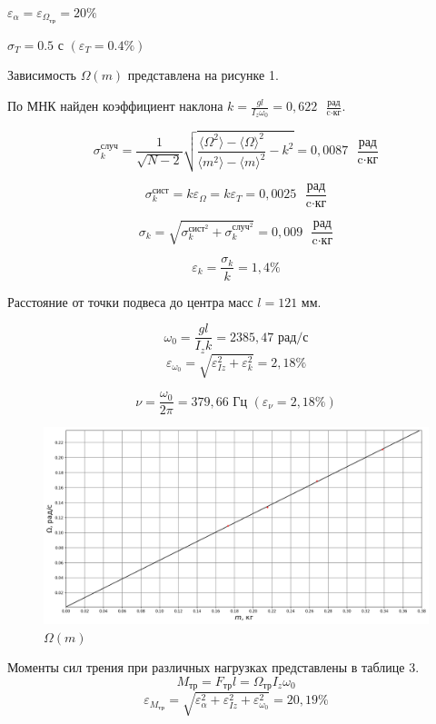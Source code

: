 \documentclass[a4paper, 12pt]{article}
\begin{document}
$\varepsilon_{\alpha} = \varepsilon_{\Omega_{\text{тр}}} = 20\%$

$\sigma_T = 0.5 \text{ с } (\varepsilon_{T} = 0.4\%)$

Зависимость $\Omega(m)$ представлена на рисунке 1.

По МНК найден коэффициент наклона $k = \frac{gl}{I_z\omega_0} = 0,622  \text{ }\frac{\text{рад}}{\text{c}\cdot\text{кг}}$.

\[ \sigma_k^{\text{случ}} = \frac{1}{\sqrt{N - 2}}\sqrt{\frac{\langle {\Omega}^2 \rangle -\langle {\Omega} \rangle^2}{
    \langle m^2 \rangle - \langle m \rangle^2} - k^2} = 0,0087 \text{ }\frac{\text{рад}}{\text{c}\cdot\text{кг}}\]

\[ \sigma_k^{\text{сист}} = k \varepsilon_{\Omega} = k \varepsilon_{T} = 0,0025 \text{ }\frac{\text{рад}}{\text{c}\cdot\text{кг}}\]

\[ \sigma_{k} = \sqrt{\sigma_k^{{\text{сист}}^2}+\sigma_k^{{\text{случ}}^2}} = 0,009 \text{ }\frac{\text{рад}}{\text{c}\cdot\text{кг}}\]

\[ \varepsilon_k = \frac{\sigma_k}{k} = 1,4 \%\]

Расстояние от точки подвеса до центра масс $l = 121$ мм.

\[ \omega_0 = \frac{gl}{I_z k} = 2385,47 \text{ рад/с}\]
\[ \varepsilon_{\omega_0} = \sqrt{\varepsilon_{Iz}^2+\varepsilon_k^2} = 2,18\%\]

\[ \nu = \frac{\omega_0}{2\pi} = 379,66 \text{ Гц } (\varepsilon_{\nu} = 2,18 \%)\]

\begin{figure}[h]
    \centering
    \includegraphics[scale = 0.5]{Screenshot 2023-11-15 141751.png}
    \caption{$\Omega(m)$}
    \label{fig:enter-label}
\end{figure}

Моменты сил трения при различных нагрузках представлены в таблице 3.
\[ M_{\text{тр}} = F_{\text{тр}}l = \Omega_{\text{тр}} I_z \omega_0\]
\[ \varepsilon_{M_{\text{тр}}} = \sqrt{\varepsilon_{\alpha}^2 + \varepsilon_{Iz}^2 + \varepsilon_{\omega_0}^2} = 20,19 \%\]
\end{document}
